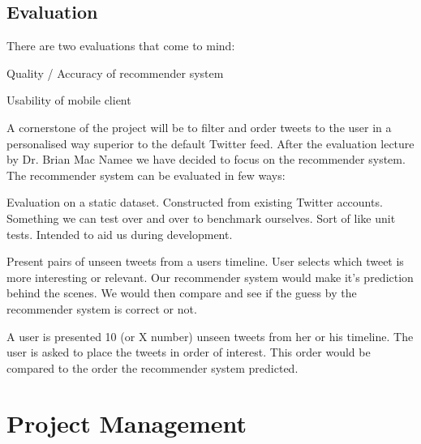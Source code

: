 \documentclass{article}
\begin{document}
\subsection{Evaluation}

There are two evaluations that come to mind:

\begin{itemize*}
	\item Quality / Accuracy of recommender system
	\item Usability of mobile client
\end{itemize*}

A cornerstone of the project will be to filter and order tweets to the user in a personalised way superior to the default Twitter feed. After the evaluation lecture by Dr. Brian Mac Namee we have decided to focus on the recommender system. The recommender system can be evaluated in few ways:

\begin{itemize*}
	\item Evaluation on a static dataset. Constructed from existing Twitter accounts. Something we can test over and over to benchmark ourselves. Sort of like unit tests. Intended to aid us during development.
	\item Present pairs of unseen tweets from a users timeline. User selects which tweet is more interesting or relevant. Our recommender system would make it's prediction behind the scenes. We would then compare and see if the guess by the recommender system is correct or not.
	\item A user is presented 10 (or X number) unseen tweets from her or his timeline. The user is asked to place the tweets in order of interest. This order would be compared to the order the recommender system predicted.
\end{itemize*}


\newpage


\section{Project Management}
\end{document}
